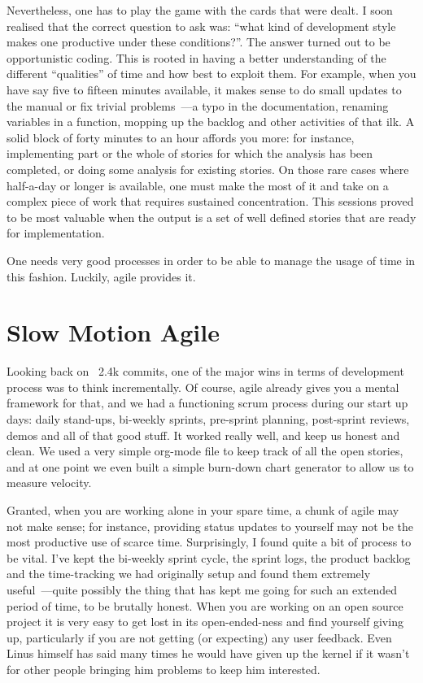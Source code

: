 \documentclass{book}
\begin{document}
Nevertheless, one has to play the game with the cards that were
dealt. I soon realised that the correct question to ask was: ``what
kind of development style makes one productive under these
conditions?''. The answer turned out to be opportunistic coding. This
is rooted in having a better understanding of the different
``qualities'' of time and how best to exploit them. For example, when
you have say five to fifteen minutes available, it makes sense to do
small updates to the manual or fix trivial problems~---a typo in the
documentation, renaming variables in a function, mopping up the
backlog and other activities of that ilk. A solid block of forty
minutes to an hour affords you more: for instance, implementing part
or the whole of stories for which the analysis has been completed, or
doing some analysis for existing stories. On those rare cases where
half-a-day or longer is available, one must make the most of it and
take on a complex piece of work that requires sustained
concentration. This sessions proved to be most valuable when the
output is a set of well defined stories that are ready for
implementation.

One needs very good processes in order to be able to manage the usage
of time in this fashion. Luckily, agile provides it.

\section{Slow Motion Agile}

Looking back on ~2.4k commits, one of the major wins in terms of
development process was to think incrementally. Of course, agile
already gives you a mental framework for that, and we had a
functioning scrum process during our start up days: daily stand-ups,
bi-weekly sprints, pre-sprint planning, post-sprint reviews, demos and
all of that good stuff. It worked really well, and keep us honest and
clean. We used a very simple org-mode file to keep track of all the
open stories, and at one point we even built a simple burn-down chart
generator to allow us to measure velocity.

Granted, when you are working alone in your spare time, a chunk of
agile may not make sense; for instance, providing status updates to
yourself may not be the most productive use of scarce
time. Surprisingly, I found quite a bit of process to be vital. I've
kept the bi-weekly sprint cycle, the sprint logs, the product backlog
and the time-tracking we had originally setup and found them extremely
useful~---quite possibly the thing that has kept me going for such an
extended period of time, to be brutally honest. When you are working
on an open source project it is very easy to get lost in its
open-ended-ness and find yourself giving up, particularly if you are
not getting (or expecting) any user feedback. Even Linus himself has
said many times he would have given up the kernel if it wasn't for
other people bringing him problems to keep him interested.
\end{document}
